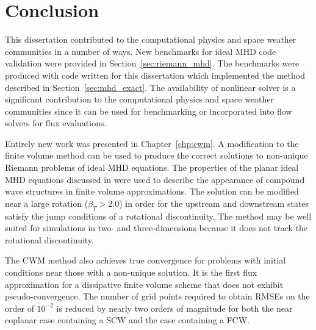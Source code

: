 %
%


\chapter[Conclusion]{Conclusion}
\label{chp:conclusion}

This dissertation contributed to the computational physics and space weather communities in a number of ways.  New benchmarks for ideal MHD code validation were provided in Section~\ref{sec:riemann_mhd}.  The benchmarks were produced with code written for this dissertation which implemented the method described in Section~\ref{sec:mhd_exact}.  The availability of nonlinear solver is a significant contribution to the computational physics and space weather communities since it can be used for benchmarking or incorporated into flow solvers for flux evaluations.  

Entirely new work was presented in Chapter~\ref{chp:cwm}.  A modification to the finite volume method can be used to produce the correct solutions to non-unique Riemann problems of ideal MHD equations.  The properties of the planar ideal MHD equations discussed in \citep{Falle:2001} were used to describe the appearance of compound wave structures in finite volume approximations.  The solution can be modified near a large rotation ($\beta_T > 2.0$) in order for the upstream and downstream states satisfy the jump conditions of a rotational discontinuity.  The method may be well suited for simulations in two- and three-dimensions because it does not track the rotational discontinuity.

The CWM method also achieves true convergence for problems with initial conditions near those with a non-unique solution.  It is the first flux approximation for a dissipative finite volume scheme that does not exhibit pseudo-convergence.  The number of grid points required to obtain RMSEs on the order of $10^{-2}$ is reduced by nearly two orders of magnitude for both the near coplanar case containing a SCW and the case containing a FCW.  

